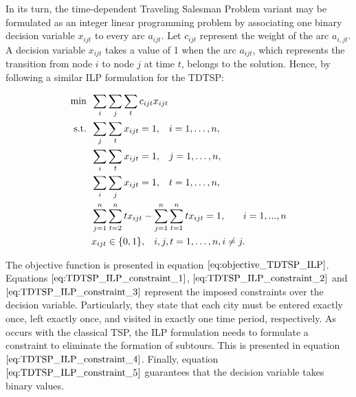 
In its turn, the time-dependent Traveling Salesman Problem variant may be formulated as an integer linear programming problem by associating one binary decision variable $x_{ijt}$ to every arc $a_{ijt}$. Let $c_{ijt}$ represent the weight of the arc $a_{i,jt}$. A decision variable $x_{ijt}$ takes a value of 1 when the arc $a_{ijt}$, which represents the transition from node $i$ to node $j$ at time $t$, belongs to the solution. Hence, by following a similar ILP formulation for the TDTSP: 

\begin{align}
  \min  &\hspace{0.5em} \sum_{i}\sum_{j}\sum_{t} c_{ijt}x_{ijt} \label{eq:objective_TDTSP_ILP} \\
  \mathrm{s.t.}   &\hspace{0.5em} \sum_{j}\sum_{t}x_{ijt} = 1 , \hspace{3mm} i = 1, \ldots, n, \label{eq:TDTSP_ILP_constraint_1}\\
  & \hspace{0.5em} \sum_{i}\sum_{t}x_{ijt} = 1, \hspace{3mm} j = 1, \ldots, n, \label{eq:TDTSP_ILP_constraint_2}\\
    & \hspace{0.5em} \sum_{i}\sum_{j}x_{ijt} = 1, \hspace{3mm} t = 1, \ldots, n, \label{eq:TDTSP_ILP_constraint_3}\\
  & \hspace{0.5em} \sum_{j = 1}^{n}\sum_{t=2}^{n}tx_{ijt} - \sum_{j = 1}^{n}\sum_{t=1}^{n}tx_{ijt}  = 1, \hspace{3mm} \quad i = 1, ... ,n \label{eq:TDTSP_ILP_constraint_4}\\
  & \hspace{0.5em} x_{ijt} \in \{0, 1\}, \hspace{3mm} i, j, t = 1, \ldots, n, i \ne j. \label{eq:TDTSP_ILP_constraint_5}
\end{align}

The objective function is presented in equation $\ref{eq:objective_TDTSP_ILP}$. Equations $\ref{eq:TDTSP_ILP_constraint_1}$, $\ref{eq:TDTSP_ILP_constraint_2}$ and $\ref{eq:TDTSP_ILP_constraint_3}$ represent the imposed constraints over the decision variable. Particularly, they state that each city must be entered exactly once, left exactly once, and visited in exactly one time period, respectively. As occurs with the classical TSP, the ILP formulation needs to formulate a constraint to eliminate the  formation of subtours. This is presented in equation $\ref{eq:TDTSP_ILP_constraint_4}$. Finally, equation $\ref{eq:TDTSP_ILP_constraint_5}$ guarantees that the decision variable takes binary values.
